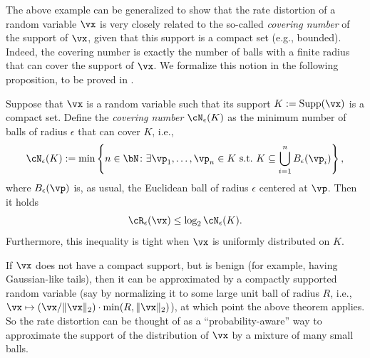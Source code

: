 \documentclass[../../book-main.tex]{subfiles}
\begin{document}
The above example can be generalized to show that the rate distortion of a random variable \(\vx\) is very closely related to the so-called \textit{covering number} of the support of \(\vx\), given that this support is a compact set (e.g., bounded). Indeed, the covering number is exactly the number of balls with a finite radius that can cover the support of \(\vx\). We formalize this notion in the following proposition, to be proved in .

\begin{proposition}\label{prop:covering-number-rate-distortion}
	Suppose that \(\vx\) is a random variable such that its support \(K := \Supp(\vx)\) is a compact set. Define the \textit{covering number} \(\cN_{\epsilon}(K)\) as the minimum number of balls of radius \(\epsilon\) that can cover \(K\), i.e.,
	\begin{equation}
		\cN_{\epsilon}(K) := \min\left\{n \in \bN \colon \exists \vp_{1}, \dots, \vp_{n} \in K\ \text{s.t.}\ K \subseteq \bigcup_{i = 1}^{n}B_{\epsilon}(\vp_{i})\right\},
	\end{equation}
	where \(B_{\epsilon}(\vp)\) is, as usual, the Euclidean ball of radius \(\epsilon\) centered at \(\vp\).
	Then it holds 
	\begin{equation}
		\cR_{\epsilon}(\vx) \leq \log_{2} \cN_{\epsilon}(K).
	\end{equation}
	Furthermore, this inequality is tight when \(\vx\) is uniformly distributed on \(K\).
\end{proposition}
If \(\vx\) does not have a compact support, but is benign (for example, having Gaussian-like tails), then it can be approximated by a compactly supported random variable (say by normalizing it to some large unit ball of radius \(R\), i.e., \(\vx \mapsto (\vx/\norm{\vx}_{2}) \cdot \min(R, \|\vx\|_{2})\)), at which point the above theorem applies. So the rate distortion can be thought of as a ``probability-aware'' way to approximate the support of the distribution of \(\vx\) by a mixture of many small balls.
\end{document}
